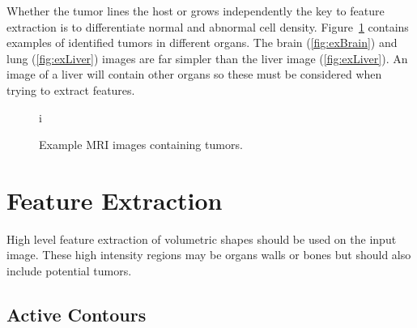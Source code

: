 \documentclass[journal]{IEEEtran}
\begin{document}
Whether the tumor lines the host or grows independently the key to feature extraction is to differentiate normal and abnormal cell density. 
Figure~\ref{fig:ex} contains examples of identified tumors in different organs.
The brain (\ref{fig:exBrain}) and lung (\ref{fig:exLiver}) images are far simpler than the liver image (\ref{fig:exLiver}).
An image of a liver will contain other organs so these must be considered when trying to extract features.

\begin{figure}
	\centering
	i
\caption{Example MRI images containing tumors.}
\label{fig:ex}
\end{figure}








\section{Feature Extraction}
\label{sec:extraction}

High level feature extraction of volumetric shapes should be used on the input image.
These high intensity regions may be organs walls or bones but should also include potential tumors.

\subsection{Active Contours}
\end{document}
